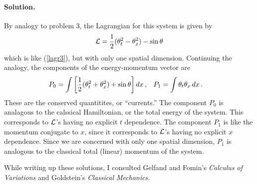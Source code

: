 \documentclass[11pt]{article}
\newcommand{\refeq}[1]{(\ref{#1})}
\newcommand{\beq}{\begin{equation*}}
\newcommand{\eeq}{\end{equation*}}
\newenvironment{solution}
{
    \paragraph{Solution.}
    \ignorespaces
}
{
    \bigskip
}
\begin{document}
\begin{solution}
	By analogy to problem 3, the Lagrangian for this system is given by
	\beq
		\Ld = \frac{1}{2} (\thtt^2 - \thtx^2) - \sint
	\eeq
	which is like \refeq{lagr3}, but with only one spatial dimension.  Continuing the analogy, the components of the energy-momentum vector are
	\begin{align*}
		P_0 &= \int \left[ \frac{1}{2} (\theta_t^2 + \theta_x^2) + \sin{\theta} \right] \dd{x}, &
		P_1 &= \int \theta_t \theta_x \dd{x}. &
	\end{align*}
	These are the conserved quantitites, or ``currents.''  The component $P_0$ is analagous to the calssical Hamiltonian, or the total energy of the system.  This corresponds to $\mathcal{L}$'s having no explicit $t$ dependence.  The component $P_1$ is like the momentum conjugate to $x$, since it corresponds to $\mathcal{L}$'s having no explicit $x$ dependence.  Since we are concerned with only one spatial dimension, $P_1$ is analogous to the classical total (linear) momentum of the system.
\end{solution}


\vfill
While writing up these solutions, I consulted Gelfand and Fomin's \emph{Calculus of Variations} and Goldstein's \emph{Classical Mechanics}.
\end{document}
